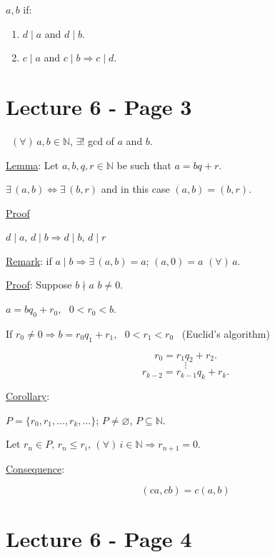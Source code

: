 \noindent $a,b$ if:

\begin{enumerate}
\item[(1)] $d\mid a$ and $d\mid b$.
\item[(2)] $c\mid a$ and $c\mid b \Rightarrow c\mid d$.
\end{enumerate}




\section*{Lecture 6 - Page 3}

\noindent{} \ $(\forall)\,a,b\in\mathbb{N}$, $\exists!$ gcd of $a$ and $b$.

\bigskip
\noindent\underline{Lemma}: Let $a,b,q,r\in\mathbb{N}$ be such that $a=bq+r$.

\noindent $\exists\,(a,b) \Leftrightarrow \exists\,(b,r)$ and in this case $(a,b)=(b,r)$.

\bigskip
\noindent\underline{Proof}

\noindent $d\mid a$, $d\mid b \Rightarrow d\mid b$, $d\mid r$

\bigskip
\noindent\underline{Remark}: if $a\mid b \Rightarrow \exists\,(a,b)=a$; $(a,0)=a$ $(\forall)\,a$.

\bigskip
\noindent\underline{Proof}: Suppose $b\nmid a$ \quad $b\neq 0$.

\noindent $a=bq_0+r_0$, \ $0<r_0<b$.

\noindent If $r_0\neq 0 \Rightarrow b=r_0q_1+r_1$, \ $0<r_1<r_0$ \ (Euclid's algorithm)

\[
r_0=r_1q_2+r_2.
\]
\[
\vdots
\]
\[
r_{k-2}=r_{k-1}q_k+r_k.
\]

\bigskip
\noindent\underline{Corollary}:

\noindent $P=\{r_0,r_1,\ldots,r_k,\ldots\}$; $P\neq\varnothing$, $P\subseteq\mathbb{N}$.

\noindent Let $r_n\in P$, $r_n\leq r_i$, $(\forall)\,i\in\mathbb{N} \Rightarrow r_{n+1}=0$.

\bigskip
\noindent\underline{Consequence}:

\[
(ca,cb)=c(a,b)
\]




\section*{Lecture 6 - Page 4}

